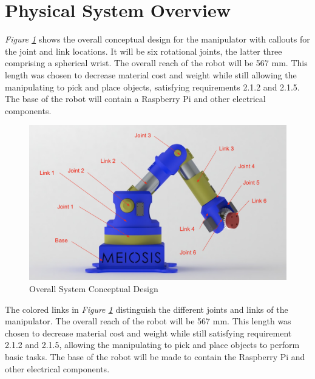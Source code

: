 \documentclass[12pt]{report}
\begin{document}
\section{Physical System Overview}
\vspace{-\baselineskip}
\emph{Figure \ref{fig:overall}} shows the overall conceptual design for the manipulator with callouts for the joint and link locations. It will be six rotational joints, the latter three comprising a spherical wrist. The overall reach of the robot will be 567 mm. This length was chosen to decrease material cost and weight while still allowing the manipulating to pick and place objects, satisfying requirements 2.1.2 and 2.1.5. The base of the robot will contain a Raspberry Pi and other electrical components.

\begin{figure}[htp]
  \centering
  \includegraphics[frame, width=.75\textwidth]{overall_render}
  \caption{Overall System Conceptual Design }
  \label{fig:overall}
\end{figure}

The colored links in \emph{Figure \ref{fig:overall}} distinguish the different joints and links of the manipulator. The overall reach of the robot will be 567 mm. This length was chosen to decrease material cost and weight while still satisfying requirement 2.1.2 and 2.1.5, allowing the manipulating to pick and place objects to perform basic tasks. The base of the robot will be made to contain the Raspberry Pi and other electrical components.
\newpage
\end{document}
